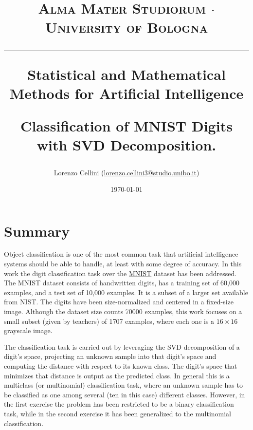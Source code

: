 \documentclass[a4paper,10pt]{report}
\renewcommand{\texttt}[1]{%
  \begingroup
  \ttfamily
  \begingroup\lccode`~=`.\lowercase{\endgroup\def~}{.\discretionary{}{}{}}%
  \catcode`/=\active\catcode`[=\active\catcode`.=\active
  \scantokens{#1\noexpand}%
  \endgroup
}
\begin{document}
\frenchspacing

\title{
  {{\large{\textsc{Alma Mater Studiorum $\cdot$ University of Bologna}}}}
  \rule{\textwidth}{0.4pt}\vspace{3mm}
  \small{Statistical and Mathematical Methods for Artificial Intelligence}

  \large{\textbf{Classification of MNIST Digits with SVD Decomposition.}}
}

\author{Lorenzo Cellini (\href{mailto:lorenzo.cellini3@studio.unibo.it}{lorenzo.cellini3@studio.unibo.it})}
\date{\today}
\maketitle
\newpage
\tableofcontents
\setcounter{tocdepth}{1}
\newpage


\chapter{Summary}\label{chap:introduction}
Object classification is one of the most common task that artificial intelligence systems should be able to handle, at least with some degree of accuracy.
In this work the digit classification task over the \href{http://yann.lecun.com/exdb/mnist/}{MNIST} dataset has been addressed. The MNIST dataset consists of handwritten digits, has a training set of 60,000 examples, and a test set of 10,000 examples.
It is a subset of a larger set available from NIST. The digits have been size-normalized and centered in a fixed-size image.
Although the dataset size counts 70000 examples, this work focuses on a small subset (given by teachers) of 1707 examples, where each one is a $16\times16$ grayscale image.

The classification task is carried out by leveraging the SVD decomposition of a digit's space, projecting an unknown sample into that digit's space and computing the distance with respect to its known class.
The digit's space that minimizes that distance is output as the predicted class.
In general this is a multiclass (or multinomial) classification task, where an unknown sample has to be classified as one among several (ten in this case) different classes.
However, in the first exercise the problem has been restricted to be a binary classification task, while in the second exercise it has been generalized to the multinomial classification.
\end{document}
